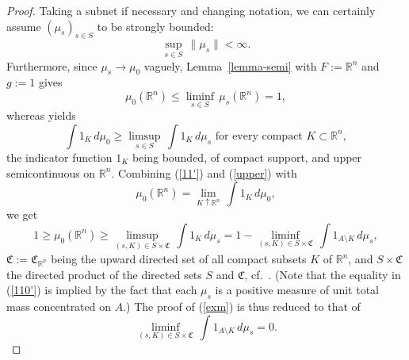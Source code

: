 \documentclass[12pt,a4paper,reqno]{amsart} %
\theoremstyle{lause}
\theoremstyle{maaritelma}
\theoremstyle{lause}
\theoremstyle{maaritelma}
\numberwithin{equation}{section}
\begin{document}
\begin{proof} Taking a subnet if necessary and changing notation, we can certainly assume $(\mu_s)_{s\in S}$ to be strongly bounded:
\begin{equation}\label{str-b}
 \sup_{s\in S}\,\|\mu_s\|<\infty.
\end{equation}
Furthermore, since $\mu_s\to\mu_0$ vaguely, Lemma~\ref{lemma-semi} with $F:=\mathbb R^n$ and $g:=1$ gives
\begin{equation}\label{11'}
 \mu_0(\mathbb R^n)\leqslant\liminf_{s\in S}\,\mu_s(\mathbb R^n)=1,
\end{equation}
whereas \cite[Section~IV.4.4, Corollary~3]{B2} yields
\begin{equation}\label{upper}\int1_K\,d\mu_0\geqslant\limsup_{s\in S}\,\int1_K\,d\mu_s\text{ \ for every compact $K\subset\mathbb R^n$},\end{equation}
the indicator function $1_K$ being bounded, of compact support, and upper semicontinuous on $\mathbb R^n$. Combining (\ref{11'}) and (\ref{upper}) with
\[\mu_0(\mathbb R^n)=\lim_{K\uparrow\mathbb R^n}\,\int1_K\,d\mu_0,\]
we get
\begin{equation}\label{110'}1\geqslant\mu_0(\mathbb R^n)\geqslant\limsup_{(s,K)\in S\times\mathfrak C}\,\int1_K\,d\mu_s=
1-\liminf_{(s,K)\in S\times\mathfrak C}\,\int1_{A\setminus K}\,d\mu_s,\end{equation}
$\mathfrak C:=\mathfrak C_{\mathbb R^n}$ being the upward directed set of all compact subsets $K$ of $\mathbb R^n$, and $S\times\mathfrak C$ the directed product of the directed sets $S$ and
$\mathfrak C$, cf.\ \cite[p.~68]{K}. (Note that the equality in (\ref{110'}) is implied by the fact that each $\mu_s$ is a positive measure of unit total mass concentrated on $A$.) The proof of (\ref{exm}) is thus reduced to that of
\begin{equation}\label{0}
  \liminf_{(s,K)\in S\times\mathfrak C}\,\int1_{A\setminus K}\,d\mu_s=0.
\end{equation}


\end{proof}
\end{document}
